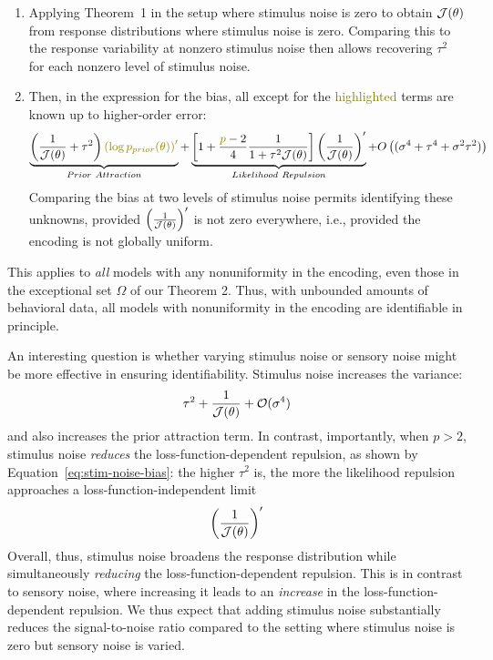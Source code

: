 \documentclass[si.tex]{subfiles}
\begin{document}
\begin{enumerate}
    \item Applying Theorem~1 in the setup where stimulus noise is zero to obtain $\mathcal{J}(\theta)$ from response distributions where stimulus noise is zero. Comparing this to the response variability at nonzero stimulus noise then allows recovering $\tau^2$ for each nonzero level of stimulus noise.
    \item Then, in the expression for the bias, all except for the \textcolor{olive}{highlighted} terms are known up to higher-order error:
    \begin{equation}
        \underbrace{\left(\frac{1}{\FI(\theta)} + \tau^2\right)    \textcolor{olive}{\left( \log p_{prior}(\theta) \right)'}}_{Prior\ Attraction}   + \underbrace{\left[ 1               + \frac{\textcolor{olive}{p}-2}{4}     \frac{1}{1+\tau^2\FI(\theta)}    \right]   \left(\frac{1}{\FI(\theta)}\right)' }_{Likelihood\ Repulsion} + O\left((\sigma^4+\tau^4+\sigma^2\tau^2)\right)
        \end{equation}
        Comparing the bias at two levels of stimulus noise permits identifying these unknowns, provided $\left(\frac{1}{\mathcal{J}(\theta)}\right)'$ is not zero everywhere, i.e., provided the encoding is not globally uniform.
\end{enumerate}
This applies to \emph{all} models with any nonuniformity in the encoding, even those in the exceptional set $\Omega$ of our Theorem 2.
Thus, with unbounded amounts of behavioral data, all models with nonuniformity in the encoding are identifiable in principle.

An interesting question is whether varying stimulus noise or sensory noise might be more effective in ensuring identifiability.
Stimulus noise increases the variance:
\begin{equation}
\tau^2 + \frac{1}{\mathcal{J}(\theta)} + \mathcal{O}(\sigma^4)
\end{equation}
and also increases the prior attraction term.
In contrast, importantly, when $p>2$, stimulus noise \emph{reduces} the loss-function-dependent repulsion, as shown by Equation~\ref{eq:stim-noise-bias}: the higher $\tau^2$ is, the more the likelihood repulsion approaches a loss-function-independent limit
\begin{equation}
\left(\frac{1}{\mathcal{J}(\theta)}\right)'
\end{equation}
Overall, thus, stimulus noise broadens the response distribution while simultaneously \emph{reducing} the loss-function-dependent repulsion.
This is in contrast to sensory noise, where increasing it leads to an \emph{increase} in the loss-function-dependent repulsion.
We thus expect that adding stimulus noise substantially reduces the signal-to-noise ratio compared to the setting where stimulus noise is zero but sensory noise is varied.
\end{document}
